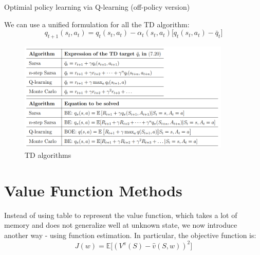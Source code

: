 \documentclass[10pt]{elegantbook}
\begin{document}
\begin{algorithm}[H]
\caption{Optimial policy learning via Q-learning (off-policy version)}

\end{algorithm}

\vspace{\baselineskip}

We can use a unified formulation for all the TD algorithm:
\[
    q_{t+1}(s_t, a_t) = q_t(s_t, a_t) - \alpha_t(s_t, a_t) \big [ q_t(s_t, a_t) - \bar q_t \big ]
\]

\begin{figure}[htbp]
    \centering
    \includegraphics[width=0.90\textwidth]{image/td.png}
    \caption{TD algorithms}
    \label{fig:td}
\end{figure}


\section{Value Function Methods}
Instead of using table to represent the value function, which takes a lot of memory and does not generalize well at unknown state, we now introduce another way - 
using function estimation. In particular, the objective function is:
\begin{equation}
    J(w) = \mathbb E \big [ (V^{\pi}(S) - \hat v(S, w))^2 \big ]
\end{equation}
\end{document}
